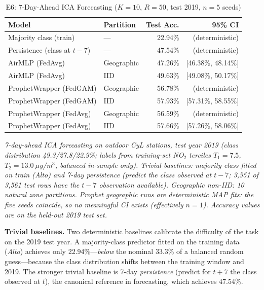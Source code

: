 \documentclass[a4paper,fleqn]{cas-dc}
\begin{document}
\begin{table}[t]
\centering
\caption{E6: 7-Day-Ahead ICA Forecasting ($K{=}10$, $R{=}50$, test 2019, $n{=}5$ seeds)}
\label{tab:e6}
\scriptsize
\setlength{\tabcolsep}{3.5pt}
\begin{tabular}{l l r r}
\toprule
\textbf{Model} & \textbf{Partition} & \textbf{Test Acc.} & \textbf{95\% CI} \\
\midrule
Majority class (train)      & ---        & 22.94\% & (deterministic) \\
Persistence (class at $t{-}7$) & ---     & 47.54\% & (deterministic) \\
\midrule
AirMLP (FedAvg)             & Geographic & 47.26\% & [46.38\%, 48.14\%] \\
AirMLP (FedAvg)             & IID        & 49.63\% & [49.08\%, 50.17\%] \\
\midrule
ProphetWrapper (FedGAM)     & Geographic & 56.78\% & (deterministic) \\
ProphetWrapper (FedGAM)     & IID        & 57.93\% & [57.31\%, 58.55\%] \\
ProphetWrapper (FedAvg)     & Geographic & 56.59\% & (deterministic) \\
ProphetWrapper (FedAvg)     & IID        & 57.66\% & [57.26\%, 58.06\%] \\
\bottomrule
\end{tabular}
\vspace{0.5em}

\emph{7-day-ahead ICA forecasting on outdoor CyL stations, test year 2019 (class distribution 49.3/27.8/22.9\%; labels from training-set NO$_2$ terciles $T_1{=}7.5$, $T_2{=}13.0~\mu$g/m$^3$, balanced in-sample only). Trivial baselines: majority class fitted on train (\textit{Alto}) and 7-day persistence (predict the class observed at $t{-}7$; 3,551 of 3,561 test rows have the $t{-}7$ observation available). Geographic non-IID: 10 natural zone partitions. Prophet geographic runs are deterministic MAP fits: the five seeds coincide, so no meaningful CI exists (effectively $n{=}1$). Accuracy values are on the held-out 2019 test set.}
\end{table}

\textbf{Trivial baselines.} Two deterministic baselines calibrate the difficulty of the task on the 2019 test year. A majority-class predictor fitted on the training data (\textit{Alto}) achieves only 22.94\%---\emph{below} the nominal 33.3\% of a balanced random guess---because the class distribution shifts between the training window and 2019. The stronger trivial baseline is 7-day \emph{persistence} (predict for $t{+}7$ the class observed at $t$), the canonical reference in forecasting, which achieves 47.54\%.
\end{document}
